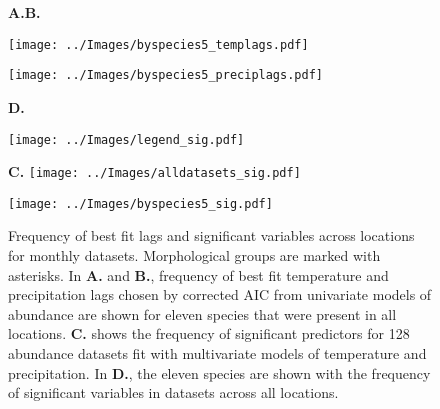 \begin{figure}
	\begin{minipage}{\textwidth}
		\hspace{.1\textwidth}
		\textbf{\Large  A.\hspace{.5\textwidth}B.}
	\end{minipage}
	\begin{minipage}{.65\textwidth }%
		\texttt{[image: ../Images/byspecies5\_templags.pdf]}
	\end{minipage}
	\begin{minipage}{2.7in}
		\texttt{[image: ../Images/byspecies5\_preciplags.pdf]}
	\end{minipage}
	\vspace{1cm}
	
	\begin{minipage}{\textwidth}
		\hspace{.1\textwidth}
		\textbf{\Large  \hspace{.47\textwidth}D.}
	\end{minipage}
	\begin{minipage}{.3\textwidth}
		\texttt{[image: ../Images/legend\_sig.pdf]}
		
		\textbf{ \Large C.}
		\texttt{[image: ../Images/alldatasets\_sig.pdf]}
	\end{minipage}
	\begin{minipage}{.7\textwidth}
		\texttt{[image: ../Images/byspecies5\_sig.pdf]}
	\end{minipage}
	
	\caption{Frequency of best fit lags and significant variables across locations for monthly datasets. Morphological groups are marked with asterisks. In \textbf{A.} and \textbf{B.}, frequency of best fit temperature and precipitation lags chosen by corrected AIC from univariate models of abundance are shown for eleven species that were present in all locations. \textbf{C.} shows the frequency of significant predictors for 128 abundance datasets fit with multivariate models of temperature and precipitation. In \textbf{D.}, the eleven species are shown with the frequency of significant variables in datasets across all locations.}
	\label{fig: acrosslocation}
	
\end{figure}
